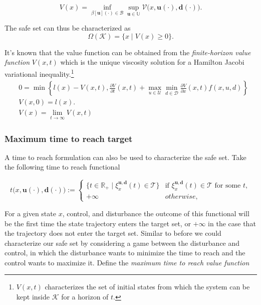 \documentclass{journal}
\newcommand{\B}{\mathcal{B}}
\newcommand{\D}{\mathcal{D}}
\newcommand{\K}{\mathcal{K}}
\newcommand{\T}{\mathcal{T}}
\newcommand{\U}{\mathcal{U}}
\newcommand{\RR}{\mathbb{R}}
\newcommand{\UU}{\mathbb{U}}
\newcommand{\bu}{\bm{u}}
\newcommand{\bdelta}{\bm{d}}
\newcommand{\bx}{\xi}
\begin{document}
\begin{equation}
V(x)=\inf_{\beta[\bu](\cdot) \in \B} \sup_{\bu \in \UU}\mathcal{V}\big(x,\bu(\cdot),\bdelta(\cdot)\big) .
\end{equation}

The safe set can thus be characterized as 
\begin{equation}
\Omega(\K) = \{x \mid V(x) \ge 0\}.
\end{equation}  

It's known that the value function can be obtained from the \emph{finite-horizon value function} $V(x,t)$ which is the unique viscosity solution for a Hamilton Jacobi variational inequality.\footnote{$V(x,t)$ characterizes the set of initial states from which the system can be kept inside $\K$ for a horizon of $t$.
} 
\begin{subequations}\label{eq:HJI}\begin{align}
    & 0 = \min\left\{l(x)-V(x,t), \frac{\partial V}{\partial t}(x,t)+ \max_{u\in\U} \min_{ d\in\D} \!\!\frac{\partial V}{\partial x}(x,t) f(x,u, d)\right\}\label{eq:HJIa}\\
    &V(x,0) = l(x).\label{eq:HJIb}\\
    &V(x) = \lim_{t \rightarrow \infty} V(x,t)
\end{align}\end{subequations}


\subsubsection{Maximum time to reach target}

A time to reach formulation can also be used to characterize the safe set. Take the following time to reach functional

\begin{equation}\label{eq:t}
t\big(x,\bu(\cdot),\bdelta(\cdot)\big) := 
\begin{cases}
 \{t \in \RR_{+} \mid \bx_{x}^{\bu,\bdelta}(t) \in \T \}  &\text{if $\bx_{x}^{\bu,\bdelta}(t) \in \T$ for some $t$}, \\
+ \infty  &otherwise,
\end{cases}
\end{equation}

For a given state $x$, control, and disturbance the outcome of this functional will be the first time the state trajectory enters the target set, or $+\infty$ in the case that the trajectory does not enter the target set. Similar to before we could characterize our safe set by considering a game between the disturbance and control, in which the disturbance wants to minimize the time to reach and the control wants to maximize it. Define the \emph{maximum time to reach value function}
\end{document}
